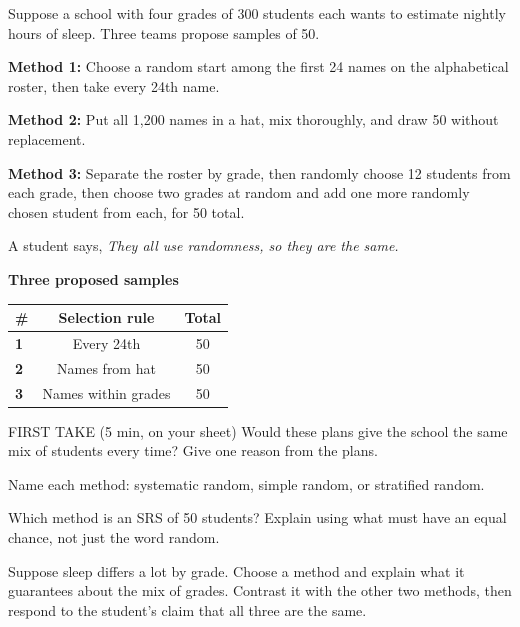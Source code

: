 \documentclass[14pt]{extarticle}
\begin{document}
\pagestyle{empty}


\noindent\begin{minipage}[t]{0.57\linewidth}
\vspace{0pt}
Suppose a school with four grades of 300 students each wants to estimate nightly hours of sleep. Three teams propose samples of 50.\par\smallskip \textbf{Method 1:} Choose a random start among the first 24 names on the alphabetical roster, then take every 24th name.\par \textbf{Method 2:} Put all 1{,}200 names in a hat, mix thoroughly, and draw 50 without replacement.\par \textbf{Method 3:} Separate the roster by grade, then randomly choose 12 students from each grade, then choose two grades at random and add one more randomly chosen student from each, for 50 total.\par\smallskip A student says, \emph{They all use randomness, so they are the same.}\par
\end{minipage}\hfill
\begin{minipage}[t]{0.40\linewidth}
\vspace{0pt}
\begin{center}
\textbf{Three proposed samples}\par\smallskip
\begin{tabular}{|l|c|c|}
\hline
\textbf{\#} & \textbf{Selection rule} & \textbf{Total} \\ \hline
\textbf{1} & Every 24th & 50 \\ \hline
\textbf{2} & Names from hat & 50 \\ \hline
\textbf{3} & Names within grades & 50 \\ \hline
\end{tabular}
\end{center}
\end{minipage}

\begin{firsttakebox}{FIRST TAKE (5 min, on your sheet)}
Would these plans give the school the same mix of students every time? Give one reason from the plans.
\end{firsttakebox}

\begin{description}[leftmargin=1.15in, labelwidth=1in, itemsep=2pt, topsep=2pt]
  \item[\dokbadge{1}~(a)] Name each method: systematic random, simple random, or stratified random.
  \item[\dokbadge{2}~(b)] Which method is an SRS of 50 students? Explain using what must have an equal chance, not just the word random.
  \item[\dokbadge{3}~(c)] Suppose sleep differs a lot by grade. Choose a method and explain what it guarantees about the mix of grades. Contrast it with the other two methods, then respond to the student's claim that all three are the same.
\end{description}
\end{document}
